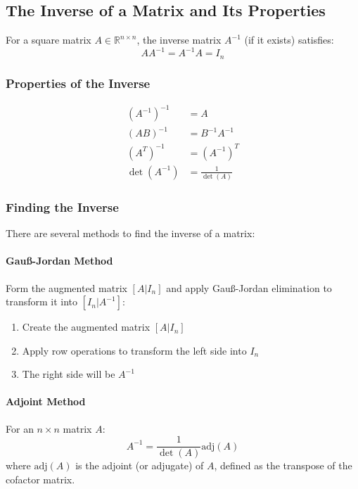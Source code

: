 \subsection{The Inverse of a Matrix and Its Properties}

For a square matrix $A \in \mathbb{R}^{n \times n}$, the inverse matrix $A^{-1}$ (if it exists) satisfies:
\begin{equation*}
A A^{-1} = A^{-1} A = I_n
\end{equation*}

\subsubsection{Properties of the Inverse}
\begin{align*}
(A^{-1})^{-1} &= A \\
(AB)^{-1} &= B^{-1}A^{-1} \\
(A^T)^{-1} &= (A^{-1})^T \\
\det(A^{-1}) &= \frac{1}{\det(A)}
\end{align*}

\subsubsection{Finding the Inverse}
There are several methods to find the inverse of a matrix:

\paragraph{Gauß-Jordan Method} 
Form the augmented matrix $[A|I_n]$ and apply Gauß-Jordan elimination to transform it into $[I_n|A^{-1}]$:
\begin{enumerate}
    \item Create the augmented matrix $[A|I_n]$
    \item Apply row operations to transform the left side into $I_n$
    \item The right side will be $A^{-1}$
\end{enumerate}

\paragraph{Adjoint Method}
For an $n \times n$ matrix $A$:
\begin{equation*}
A^{-1} = \frac{1}{\det(A)} \text{adj}(A)
\end{equation*}
where $\text{adj}(A)$ is the adjoint (or adjugate) of $A$, defined as the transpose of the cofactor matrix.

